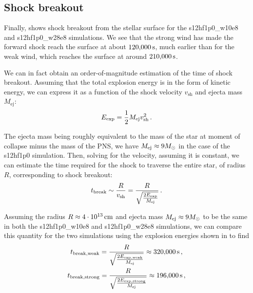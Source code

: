 \clearpage

\subsection{Shock breakout} \label{sec:breakout}

Finally,  shows shock breakout from the stellar surface for the s12hf1p0\_w10e8 and s12hf1p0\_w28e8 simulations. We see that the strong wind has made the forward shock reach the surface at about \(120{,}000\,\mathrm{s}\), much earlier than for the weak wind, which reaches the surface at around \(210{,}000\,\mathrm{s}\).

We can in fact obtain an order-of-magnitude estimation of the time of shock breakout. Assuming that the total explosion energy is in the form of kinetic energy, we can express it as a function of the shock velocity \(v_\mathrm{sh}\) and ejecta mass \(M_\mathrm{ej}\):
\begin{equation}
    E_\mathrm{exp} = \frac{1}{2} M_\mathrm{ej} v_\mathrm{sh}^2 \,\mathrm{.}
\end{equation}

The ejecta mass being roughly equivalent to the mass of the star at moment of collapse minus the mass of the PNS, we have \(M_\mathrm{ej} \approx 9 M_{\odot}\) in the case of the s12hf1p0 simulation. Then, solving for the velocity, assuming it is constant, we can estimate the time required for the shock to traverse the entire star, of radius \(R\), corresponding to shock breakout:
\begin{equation}
    t_\mathrm{break} \sim \frac{R}{v_\mathrm{sh}} = \frac{R}{\sqrt{\frac{2 E_\mathrm{exp}}{M_\mathrm{ej}}}} \,\mathrm{.}
\end{equation}

Assuming the radius \(R \approx 4 \cdot 10^{13}\,\mathrm{cm}\) and ejecta mass \(M_\mathrm{ej} \approx 9 M_{\odot}\) to be the same in both the s12hf1p0\_w10e8 and s12hf1p0\_w28e8 simulations, we can compare this quantity for the two simulations using the explosion energies shown in  to find
\begin{gather}
    t_\mathrm{break,weak} = \frac{R}{\sqrt{\frac{2E_\mathrm{exp,weak}}{M_\mathrm{ej}}}} \approx 320{,}000\,\mathrm{s} \,\mathrm{,} \\
    t_\mathrm{break,strong} = \frac{R}{\sqrt{\frac{2E_\mathrm{exp,strong}}{M_\mathrm{ej}}}} \approx 196{,}000\,\mathrm{s} \,\mathrm{,}
\end{gather}

